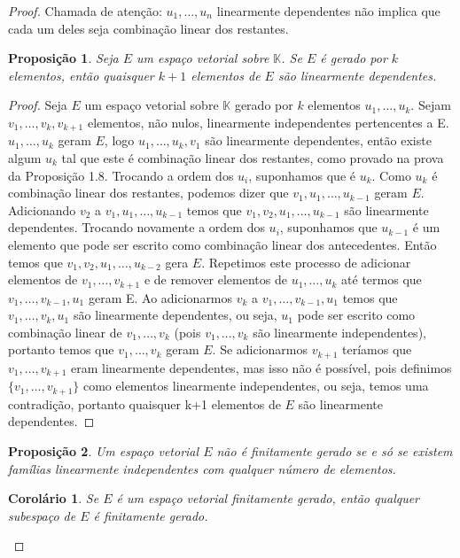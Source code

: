 \documentclass{article}
\newtheorem{corollary}{Corolário}[section]
\newtheorem{proposition}{Proposição}[section]
\newcommand{\K}{\mathbb{K}}
\begin{document}
\begin{proof}
	Chamada de atenção: $u_1,\dots,u_n$ linearmente dependentes não implica que cada um deles seja combinação linear dos restantes.


	\begin{proposition}
		Seja $E$ um espaço vetorial sobre $\mathbb{K}$.
		Se $E$ é gerado por $k$ elementos, então quaisquer $k+1$ elementos de $E$ são linearmente dependentes.

	\end{proposition}

	\begin{proof}
		Seja $E$ um espaço vetorial sobre $\K $ gerado por $k$ elementos $u_1,\dots,u_k$. Sejam $v_1,\dots,v_k,v_{k+1}$ elementos, não nulos, linearmente independentes pertencentes a E. $u_1,\dots,u_k$ geram $E$, logo $u_1,\dots,u_k,v_1$ são linearmente dependentes, então existe algum $u_k$ tal que este é combinação linear dos restantes, como provado na prova da Proposição 1.8. Trocando a ordem dos $u_i$, suponhamos que é $u_k$. Como $u_k$ é combinação linear dos restantes, podemos dizer que $v_1,u_1,\dots,u_{k-1}$ geram $E$. Adicionando $v_2$ a $v_1,u_1,\dots,u_{k-1}$ temos que $v_1,v_2,u_1,\dots,u_{k-1}$ são linearmente dependentes. Trocando novamente a ordem dos $u_i$, suponhamos que $u_{k-1}$ é um elemento que pode ser escrito como combinação linear dos antecedentes. Então temos que $v_1,v_2,u_1,\dots,u_{k-2}$ gera $E$. Repetimos este processo de adicionar elementos de $v_1,\dots,v_{k+1}$ e de remover elementos de $u_1,\dots,u_k$ até termos que $v_1,\dots,v_{k-1},u_1$ geram E. Ao adicionarmos $v_k$ a  $v_1,\dots,v_{k-1},u_1$ temos que $v_1,\dots,v_k,u_1$ são linearmente dependentes, ou seja, $u_1$ pode ser escrito como combinação linear de $v_1,\dots,v_k$ (pois $v_1,\dots,v_k$ são linearmente independentes), portanto temos que $v_1,\dots,v_k$ geram $E$. Se adicionarmos  $v_{k+1}$  teríamos que $v_1,\dots,v_{k+1}$ eram linearmente dependentes, mas isso não é possível, pois definimos $\{v_1,\dots,v_{k+1}\}$ como elementos linearmente independentes, ou seja, temos uma contradição, portanto quaisquer k+1 elementos de $E$ são linearmente dependentes.
	\end{proof}


	\begin{proposition}
		Um espaço vetorial $E$ não é finitamente gerado se e só se existem famílias linearmente independentes com qualquer número de elementos.

	\end{proposition}

	\begin{corollary}
		Se $E$ é um espaço vetorial finitamente gerado, então qualquer subespaço de $E$ é finitamente gerado.
	\end{corollary}


\end{proof}
\end{document}
